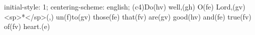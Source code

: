 initial-style: 1;
centering-scheme: english;
(c4)Do(hv) well,(gh) O(fe) Lord,(gv) <sp>*</sp>(,) un(f)to(gv) those(fe) that(fv) are(gv) good(hv) and(fe) true(fv) of(fv) heart.(e)
